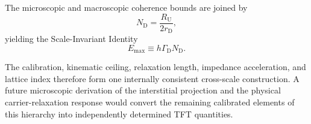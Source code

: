 The microscopic and macroscopic coherence bounds are joined by
\begin{equation}
    N_{\mathrm D}
    =
    \frac{
        R_{\mathrm U}
    }{
        2r_{\mathrm D}
    },
\end{equation}
yielding the Scale-Invariant Identity
\begin{equation}
    \boxed{
    E_{\mathrm{max}}
    \equiv
    h\Gamma_{\mathrm D}N_{\mathrm D}.
    }
\end{equation}

The calibration, kinematic ceiling, relaxation length, impedance acceleration,
and lattice index therefore form one internally consistent cross-scale
construction. A future microscopic derivation of the interstitial projection
and the physical carrier-relaxation response would convert the remaining
calibrated elements of this hierarchy into independently determined TFT
quantities.